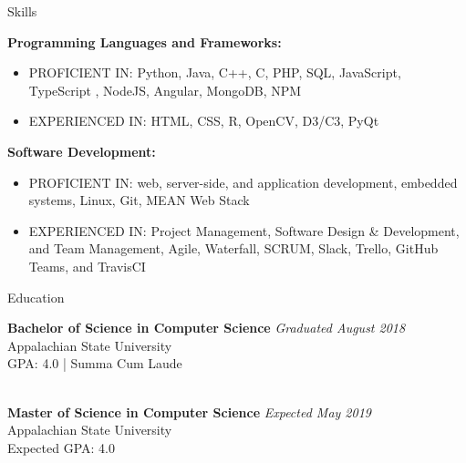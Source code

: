 \documentclass{resume} %
\begin{document}





\begin{rSection}{Skills}

{\bf Programming Languages and Frameworks:}
\begin{itemize}
    \item PROFICIENT IN: Python, Java, C++, C, PHP, SQL, JavaScript, TypeScript , NodeJS, Angular, MongoDB, NPM
    \item EXPERIENCED IN: HTML, CSS, R, OpenCV, D3/C3, PyQt
\end{itemize}
{\bf Software Development:}
\begin{itemize}
    \item PROFICIENT IN: web, server-side, and application development, embedded systems, Linux, Git, MEAN Web Stack
    \item EXPERIENCED IN: Project Management, Software Design & Development, and Team Management, Agile, Waterfall, SCRUM, Slack, Trello, GitHub Teams, and TravisCI
\end{itemize}
\end{rSection}


\begin{rSection}{Education}

{\bf Bachelor of Science in Computer Science} \hfill {\em Graduated August 2018} 
\\ Appalachian State University
\\ GPA: 4.0 | Summa Cum Laude

\\{\bf Master of Science in Computer Science} \hfill {\em Expected May 2019} 
\\ Appalachian State University
\\ Expected GPA: 4.0

\end{rSection}
\end{document}
